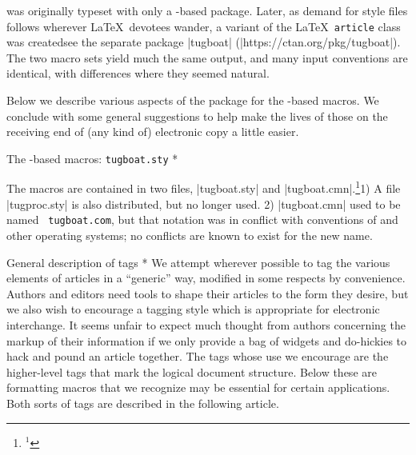 \TUB\/ was originally typeset with only a \plain-based package. Later,
as demand for style files follows wherever \LaTeX\ devotees wander, a
\TUB\/ variant of the \LaTeX\ {\tt article} class was created\Dash see
the separate package |tugboat| (|https://ctan.org/pkg/tugboat|). The
two macro sets yield much the same output, and many input conventions
are identical, with differences where they seemed natural.

Below we describe various aspects of the \TUB\/ package for the
\plain-based macros. We conclude with some general suggestions to help
make the lives of those on the receiving end of (any kind of) electronic
copy a little easier.


\head * The \plain-based macros: {\tt tugboat.sty} *

The macros are contained in two files, |tugboat.sty| and
|tugboat.cmn|.\footnote{$^1$}{1) A file |tugproc.sty| is also
distributed, but no longer used. 2) |tugboat.cmn| used to be named {\tt
tugboat.com}, but that notation was in conflict with conventions of
 and other operating systems; no conflicts are known to
exist for the new name.}

\subhead * General description of tags * We attempt wherever possible to
tag the various elements of \TUB\/ articles in a ``generic'' way,
modified in some respects by convenience.  Authors and editors need
tools to shape their articles to the form they desire, but we also wish
to encourage a tagging style which is appropriate for electronic
interchange.  It seems unfair to expect much thought from authors
concerning the markup of their information if we only provide a bag of
widgets and do-hickies to hack and pound an article together.  The tags
whose use we encourage are the higher-level tags that mark the logical
document structure.  Below these are formatting macros that we recognize
may be essential for certain applications.  Both sorts of tags are
described in the following article.

